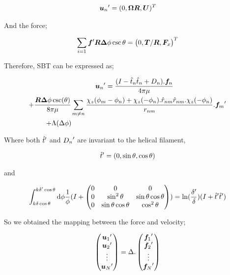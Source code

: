 \documentclass[12pt,a4paper,titlepage]{report}
\begin{document}
\begin{equation}
{\bm{u}_n}\rq{}= (0, \bm{\Omega} \bm{R} , \bm{U})^T
\label{NewVelo1}
\end{equation}

And the force;


\begin{equation}
\sum_{i=1} {\bm{f}}\rq{} \bm{R} \bm{\Delta}\phi \csc \theta = {\big(0, \bm{T}/\bm{R}, \bm{F}_x \big)}^T
\label{Newforce1}
\end{equation}

Therefore, \ac*{SBT} can be expressed as;

\begin{multline}
\qquad {\bm{u}_n}\rq{}= \frac{(I- \hat{t}_n\hat{t}_n + D_n). \bm{f}_n}{4\pi \mu}\\
+ \frac{\bm{R}\bm{\Delta}\phi \csc (\theta)}{8 \pi \mu} \sum_{m \neq n}  \frac{ \chi_z(\phi_m - \phi_n)+ \chi_z(-\phi_n).\hat{r}_{nm}\hat{r}_{nm}. \chi_z(-\phi_n)}{r_{nm}}. {\bm{f}_m}\rq{}\\
+ \Lambda (\Delta \phi) \qquad \qquad \qquad \qquad \qquad \qquad \qquad \qquad \qquad \qquad
\label{NewVelo2}
\end{multline} 



Where both ${\hat{t}}\rq{}$ and ${D_n}\rq{}$ are invariant to the helical filament,


\begin{equation}
{\hat{t}}\rq{}= (0, \sin \theta, \cos \theta)
\label{invariant}
\end{equation}


and 


\begin{equation}
\int_{k \delta \cos \theta}^{k {\delta}\rq{} \cos \theta} \mathrm  d\phi \frac{1}{\phi}(I +\begin{pmatrix}
  0 & 0 & 0 \\
  0 & \sin^2\theta  & \sin\theta\cos\theta \\
  0 & \sin\theta\cos\theta & \cos^2\theta
 \end{pmatrix})=\ln(\frac{\delta\rq{}}{\delta})(I + {\hat{t}}\rq{} {\hat{t}}\rq{})
\label{FinalD}
\end{equation}


So we obtained the mapping between the force and velocity;



\begin{equation}
\begin{pmatrix}
  {\bm{u}_1}\rq{}  \\
  {\bm{u}_2}\rq{} \\
  \vdots  \\
   {\bm{u}_N}\rq{} 
 \end{pmatrix} = \Delta . \begin{pmatrix}
  {\bm{f}_1}\rq{}  \\
  {\bm{f}_2}\rq{} \\
  \vdots  \\
   {\bm{f}_N}\rq{} 
 \end{pmatrix}
\label{mapping}
\end{equation}
\end{document}
